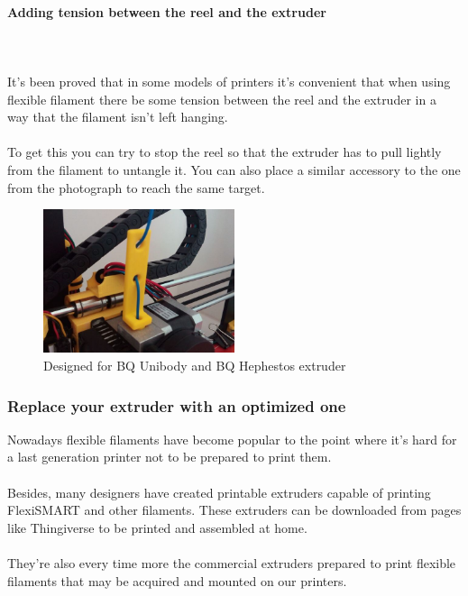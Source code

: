 \documentclass[11pt,a4paper]{article}
\begin{document}
			\paragraph{Adding tension between the reel and the extruder}\mbox{}\\\\
It’s been proved that in some models of printers it’s convenient that when using flexible filament there be some tension between the reel and the extruder in a way that the filament isn’t left hanging.
\\\\
To get this you can try to stop the reel so that the extruder has to pull lightly from the filament to untangle it. You can also place a similar accessory to the one from the photograph to reach the same target.
\begin{figure}[H]
\centering
\includegraphics[width=0.5\textwidth,cfbox=azul_marcos 4pt 0pt]{FOTOS/SOLUCION2}
\caption*{Designed for BQ Unibody and BQ Hephestos extruder}
\end{figure}
		\subsubsection{Replace your extruder with an optimized one}
Nowadays flexible filaments have become popular to the point where it’s hard for a last generation printer not to be prepared to print them.
\\\\
Besides, many designers have created printable extruders capable of printing FlexiSMART and other filaments. These extruders can be downloaded from pages like Thingiverse to be printed and assembled at home.
\\\\
They’re also every time more the commercial extruders prepared to print flexible filaments that may be acquired and mounted on our printers.
\end{document}
